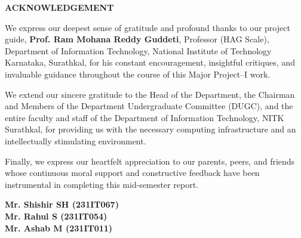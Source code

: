\documentclass[12pt,a4paper]{report}
\begin{document}
\begin{center}
    \textbf{{\Large ACKNOWLEDGEMENT}}\\
    \thispagestyle{empty}
\end{center}
\vspace{1em}

We express our deepest sense of gratitude and profound thanks to our project guide, \textbf{Prof. Ram Mohana Reddy Guddeti}, Professor (HAG Scale), Department of Information Technology, National Institute of Technology Karnataka, Surathkal, for his constant encouragement, insightful critiques, and invaluable guidance throughout the course of this Major Project--I work.

We extend our sincere gratitude to the Head of the Department, the Chairman and Members of the Department Undergraduate Committee (DUGC), and the entire faculty and staff of the Department of Information Technology, NITK Surathkal, for providing us with the necessary computing infrastructure and an intellectually stimulating environment.

Finally, we express our heartfelt appreciation to our parents, peers, and friends whose continuous moral support and constructive feedback have been instrumental in completing this mid-semester report.

\vspace{3em}
\begin{flushright}
    \textbf{Mr. Shishir SH (231IT067)}\\
    \textbf{Mr. Rahul S (231IT054)}\\
    \textbf{Mr. Ashab M (231IT011)}
\end{flushright}
\clearpage

\setcounter{page}{1}
\end{document}
